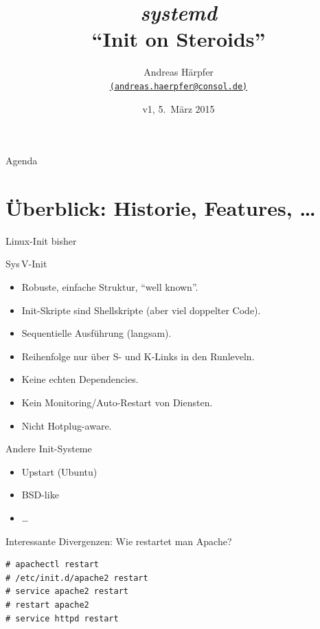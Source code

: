 
\title[systemd]{\emph{\huge systemd}\\[1ex] ``Init on Steroids''}
\author[Andreas Härpfer]{Andreas Härpfer \\
  {\scriptsize \href{mailto:andreas.haerpfer@consol.de}
   {\nolinkurl{(andreas.haerpfer@consol.de)}}}}
\date{v1, 5.~März 2015}

\subject{systemd}






\begin{frame}[plain]
\titlepage
\end{frame}

\begin{frame}{Agenda}
\tableofcontents
\end{frame}

\section[Überblick]{Überblick: Historie, Features, \dots}

\begin{frame}{Linux-Init bisher}
\begin{block}{Sys\,V-Init}
\begin{itemize}
\item Robuste, einfache Struktur, "`well known"'.
\item Init-Skripte sind Shellskripte (aber viel doppelter Code).
\item Sequentielle Ausführung (langsam).
\item Reihenfolge nur über S- und K-Links in den Runleveln.
\item Keine echten Dependencies.
\item Kein Monitoring/Auto-Restart von Diensten.
\item Nicht Hotplug-aware.
\end{itemize}
\end{block}

\begin{block}{Andere Init-Systeme}
\begin{itemize}
\item Upstart (Ubuntu)
\item BSD-like
\item \dots
\end{itemize}
\end{block}

\framebreak
Interessante Divergenzen: Wie restartet man Apache?

\begin{lstlisting}[style=numbered]
# apachectl restart
# /etc/init.d/apache2 restart
# service apache2 restart
# restart apache2
# service httpd restart
\end{lstlisting}
\end{frame}


